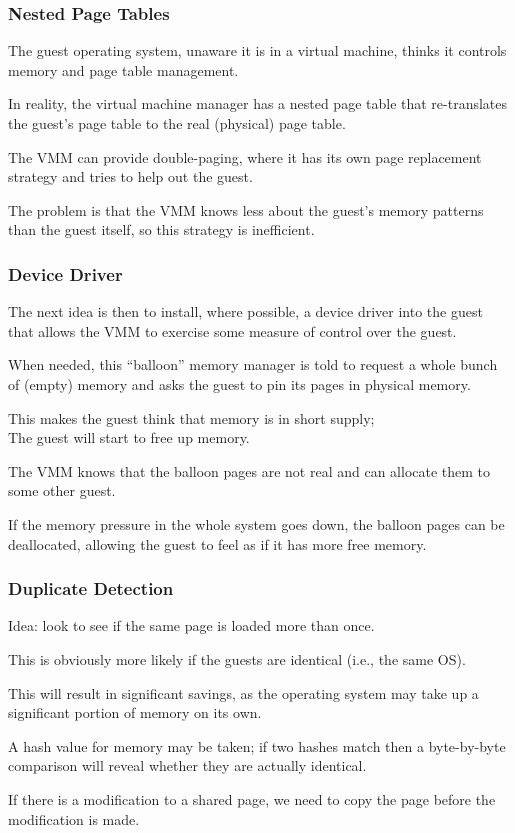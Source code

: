 \begin{frame}
\frametitle{Nested Page Tables}

The guest operating system, unaware it is in a virtual machine, thinks it controls memory and page table management. 

In reality, the virtual machine manager has a nested page table that re-translates the guest's page  table to the real (physical) page table. 

The VMM can provide double-paging, where it has its own page replacement strategy and tries to help out the guest.

The problem is that the VMM knows less about the guest's memory patterns than the guest itself, so this strategy is inefficient.


\end{frame}

\begin{frame}
\frametitle{Device Driver}

The next idea is then to install, where possible, a device driver into the guest that allows the VMM to exercise some measure of control over the guest. 

When needed, this ``balloon'' memory manager is told to request a whole bunch of (empty) memory and asks the guest to pin its pages in physical memory. 

This makes the guest think that memory is in short supply;\\
\quad The guest will start to free up memory. 

The VMM knows that the balloon pages are not real and can allocate them to some other guest. 

If the memory pressure in the whole system goes down, the balloon pages can be deallocated, allowing the guest to feel as if it has more free memory.

\end{frame}



\begin{frame}
\frametitle{Duplicate Detection}

Idea: look to see if the same page is loaded more than once. 

This is obviously more likely if the guests are identical (i.e., the same OS). 

This will result in significant savings, as the operating system may take up a significant portion of memory on its own. 

A hash value for memory may be taken; if two hashes match then a byte-by-byte comparison will reveal whether they are actually identical. 

If there is a modification to a shared page, we need to copy the page before the modification is made.


\end{frame}

